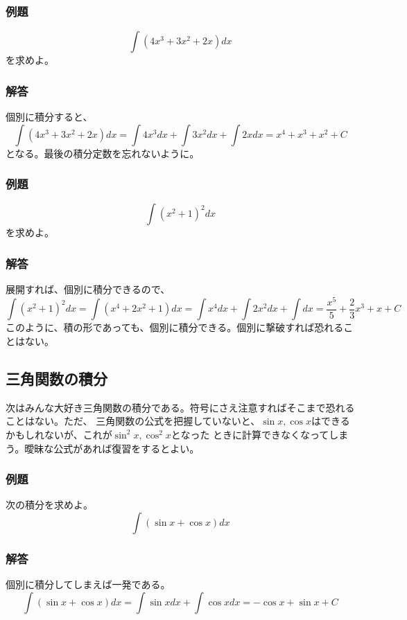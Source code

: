 \documentclass[a4j,dvipdfmx]{jsarticle}
\begin{document}
\subsubsection{例題}
\begin{equation*}
    \int (4x^3+3x^2+2x)dx
\end{equation*}
を求めよ。
\subsubsection*{解答}
個別に積分すると、
\begin{equation*}
    \int (4x^3+3x^2+2x)dx=\int 4x^3dx+\int 3x^2dx+\int 2xdx=x^4+x^3+x^2+C
\end{equation*}
となる。最後の積分定数を忘れないように。

\subsubsection{例題}
\begin{equation*}
    \int (x^2+1)^2dx
\end{equation*}
を求めよ。
\subsubsection*{解答}
展開すれば、個別に積分できるので、
\begin{equation*}
    \int (x^2+1)^2dx=\int (x^4+2x^2+1)dx=\int x^4dx+\int 2x^2dx+\int dx=\frac{x^5}{5}+\frac{2}{3}x^3+x+C
\end{equation*}
このように、積の形であっても、個別に積分できる。個別に撃破すれば恐れることはない。
\newpage
\subsection{三角関数の積分}
次はみんな大好き三角関数の積分である。符号にさえ注意すればそこまで恐れることはない。ただ、
三角関数の公式を把握していないと、$\sin x,\cos x$はできるかもしれないが、これが$\sin^2 x,\cos^2 x$となった
ときに計算できなくなってしまう。曖昧な公式があれば復習をするとよい。
\subsubsection{例題}
次の積分を求めよ。
\begin{equation*}
    \int (\sin x+\cos x) dx
\end{equation*}
\subsubsection*{解答}
個別に積分してしまえば一発である。
\begin{equation*}
    \int(\sin x+\cos x)dx=\int \sin xdx+\int \cos xdx=-\cos x+\sin x+C
\end{equation*}
\end{document}
